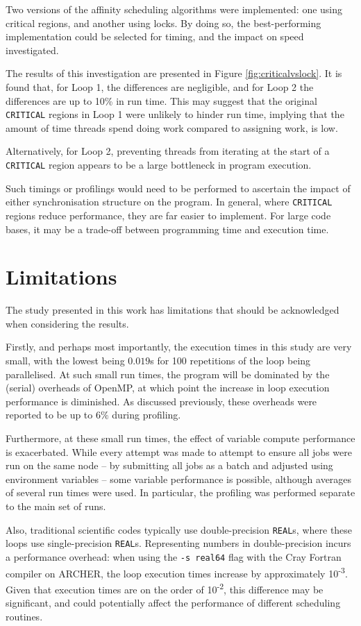 \documentclass{article} %
\newcommand{\tp}{\texttt}
\begin{document}
Two versions of the affinity scheduling algorithms were implemented: one using critical regions, and another using locks.
By doing so, the best-performing implementation could be selected for timing, and the impact on speed investigated.

The results of this investigation are presented in Figure \ref{fig:criticalvslock}. 
It is found that, for Loop 1, the differences are negligible, and for Loop 2 the differences are up to 10\% in run time.
This may suggest that the original \tp{CRITICAL} regions in Loop 1 were unlikely to hinder run time, implying that the amount of time threads spend doing work compared to assigning work, is low.

Alternatively, for Loop 2, preventing threads from iterating at the start of a \tp{CRITICAL} region appears to be a large bottleneck in program execution.

Such timings or profilings would need to be performed to ascertain the impact of either synchronisation structure on the program.
In general, where \tp{CRITICAL} regions reduce performance, they are far easier to implement.
For large code bases, it may be a trade-off between programming time and execution time.

\section*{Limitations}

The study presented in this work has limitations that should be acknowledged when considering the results.

Firstly, and perhaps most importantly, the execution times in this study are very small, with the lowest being $0.019$s for 100 repetitions of the loop being parallelised.
At such small run times, the program will be dominated by the (serial) overheads of OpenMP, at which point the increase in loop execution performance is diminished.
As discussed previously, these overheads were reported to be up to $6\%$ during profiling. 

Furthermore, at these small run times, the effect of variable compute performance is exacerbated. 
While every attempt was made to attempt to ensure all jobs were run on the same node -- by submitting all jobs as a batch and adjusted using environment variables -- some variable performance is possible, although averages of several run times were used.
In particular, the profiling was performed separate to the main set of runs.

Also, traditional scientific codes typically use double-precision \tp{REAL}s, where these loops use single-precision \tp{REAL}s.
Representing numbers in double-precision incurs a performance overhead:
when using the \tp{-s real64} flag with the Cray Fortran compiler on ARCHER, the loop execution times increase by approximately 10\textsuperscript{-3}.
Given that execution times are on the order of 10\textsuperscript{-2}, this difference may be significant, and could potentially affect the performance of different scheduling routines.
\end{document}
